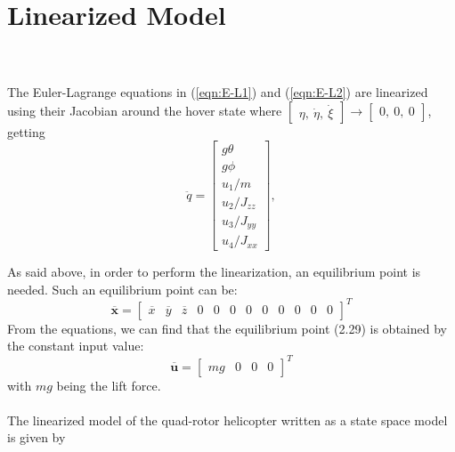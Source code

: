 \section{Linearized Model}
\setcounter{MaxMatrixCols}{20}
\cite{Sabatino2015}
\\\\
The Euler-Lagrange equations in (\ref{eqn:E-L1}) and (\ref{eqn:E-L2}) are linearized using their Jacobian around the hover state where $\begin{bmatrix}
\eta,\ \dot{\eta},\ \dot{\xi}
\end{bmatrix} \to \begin{bmatrix}
0,\ 0,\ 0
\end{bmatrix}$, getting
\begin{equation}
\label{eqn:linear}
\ddot{q}
=
\begin{bmatrix}
g\theta \\
g\phi\\
u_{1}/m \\
u_{2}/J_{zz} \\
u_{3}/J_{yy} \\
u_{4}/J_{xx}
\end{bmatrix},
\end{equation}

As said above, in order to perform the linearization, an equilibrium point is
needed. Such an equilibrium point can be:
\begin{equation}
\overline{\mathbf{x}} = \begin{bmatrix}
\overline{x} & \overline{y} & \overline{z} & 0 & 0 & 0 & 0 & 0 & 0 & 0 & 0 & 0
\end{bmatrix}^{T}
\end{equation}
From the equations, we can find that the equilibrium point (2.29) is obtained by
the constant input value:
\begin{equation}
\overline{\mathbf{u}} = \begin{bmatrix}
mg & 0 & 0 & 0
\end{bmatrix}^{T}
\end{equation}
with $mg$ being the lift force.
\\\\
The linearized model of the quad-rotor helicopter written as a state space model is given by

